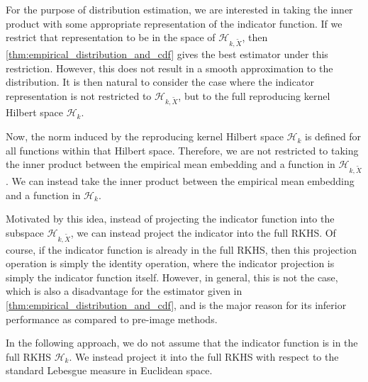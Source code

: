 \documentclass[twoside]{article} \usepackage{aistats2017}
\theoremstyle{definition}
\theoremstyle{theorem}
\newcommand{\ds}[1]{\tilde{#1}}
\begin{document}
		For the purpose of distribution estimation, we are interested in taking the inner product with some appropriate representation of the indicator function. If we restrict that representation to be in the space of $\mathcal{H}_{k, \ds{X}}$, then \cref{thm:empirical_distribution_and_cdf} gives the best estimator under this restriction. However, this does not result in a smooth approximation to the distribution. It is then natural to consider the case where the indicator representation is not restricted to $\mathcal{H}_{k, \ds{X}}$, but to the full reproducing kernel Hilbert space $\mathcal{H}_{k}$.

		Now, the norm induced by the reproducing kernel Hilbert space $\mathcal{H}_{k}$ is defined for all functions within that Hilbert space. Therefore, we are not restricted to taking the inner product between the empirical mean embedding and a function in $\mathcal{H}_{k, \ds{X}}$. We can instead take the inner product between the empirical mean embedding and a function in $\mathcal{H}_{k}$.
		
		Motivated by this idea, instead of projecting the indicator function into the subspace $\mathcal{H}_{k, \ds{X}}$, we can instead project the indicator into the full RKHS. Of course, if the indicator function is already in the full RKHS, then this projection operation is simply the identity operation, where the indicator projection is simply the indicator function itself. However, in general, this is not the case, which is also a disadvantage for the estimator given in \cref{thm:empirical_distribution_and_cdf}, and is the major reason for its inferior performance as compared to pre-image methods.
		
		In the following approach, we do not assume that the indicator function is in the full RKHS $\mathcal{H}_{k}$. We instead project it into the full RKHS with respect to the standard Lebesgue measure in Euclidean space.
		
		
\end{document}
